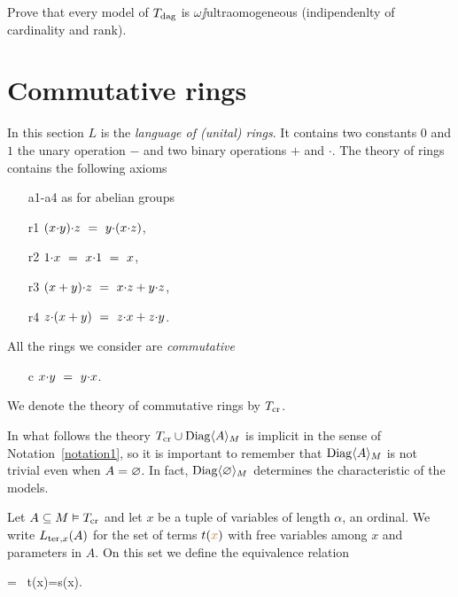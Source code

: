 \documentclass[creche.tex]{subfiles}
\begin{document}
\begin{exercise}
Prove that every model of $T_{\rm dag}$ is $\omega\jj$ultraomogeneous (indipendenlty of cardinality and rank).\QED
\end{exercise}

\section{Commutative rings}
\label{anelli}

In this section $L$ is the \emph{language of (unital) rings}. It contains two constants $0$ and $1$ the unary operation $-$ and two binary operations $+$ and $\cdot$. The theory of rings contains the following axioms

\begin{itemize}
\item[a1-a4] as for abelian groups
\item[r1] $(x\mdot y)\mdot z\  =\ y\mdot(x\mdot z)$,
\item[r2] $1\mdot x\ =\ x\mdot 1\ =\ x$,
\item[r3] $(x+y)\mdot z\ =\ x\mdot z + y\mdot z$,
\item[r4] $z\mdot (x+y)\ =\ z\mdot x + z\mdot y$.
\end{itemize}

All the rings we consider are \emph{commutative\/} 

\begin{itemize}
\item[c] $x\mdot y\ =\ y\mdot x$.
\end{itemize}
 
We denote the theory of commutative rings by \emph{$T_{\rm cr}$}.

In what follows the theory $T_{\rm cr}\cup\Diag\<A\>_M$ is implicit in the sense of Notation~\ref{notation1}, so it is important to remember that $\Diag\<A\>_M$ is not trivial even when $A=\0$. In fact, $\Diag\<\0\>_M$ determines the characteristic of the models.

Let  $A\subseteq M\models T_{\rm cr}$ and let $x$ be a tuple of variables of length $\alpha$, an ordinal. We write $L_{{\rm ter},x}(A)$ for the set of terms $t({\mr x})$ with free variables among $x$ and parameters in $A$. On this set we define the equivalence relation

%
{=}%
{\proves \ t({\mr x})=s({\mr x}).}
\end{document}
